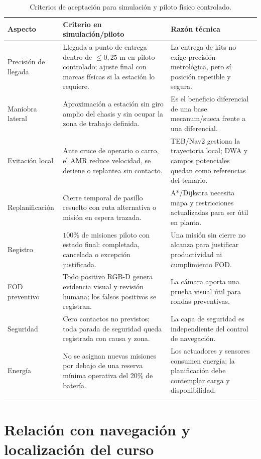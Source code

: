 \begin{longtable}{P{0.24\textwidth}P{0.30\textwidth}P{0.36\textwidth}}
\toprule
Aspecto & Criterio en simulación/piloto & Razón técnica\\
\midrule
\endhead
Precisión de llegada & Llegada a punto de entrega dentro de \(\leq 0,25\) m en piloto controlado; ajuste final con marcas físicas si la estación lo requiere. & La entrega de kits no exige precisión metrológica, pero sí posición repetible y segura.\\
Maniobra lateral & Aproximación a estación sin giro amplio del chasis y sin ocupar la zona de trabajo definida. & Es el beneficio diferencial de una base mecanum/sueca frente a una diferencial.\\
Evitación local & Ante cruce de operario o carro, el AMR reduce velocidad, se detiene o replantea sin contacto. & TEB/Nav2 gestiona la trayectoria local; DWA y campos potenciales quedan como referencias del temario.\\
Replanificación & Cierre temporal de pasillo resuelto con ruta alternativa o misión en espera trazada. & A*/Dijkstra necesita mapa y restricciones actualizadas para ser útil en planta.\\
Registro & \(100\%\) de misiones piloto con estado final: completada, cancelada o excepción justificada. & Una misión sin cierre no alcanza para justificar productividad ni cumplimiento FOD.\\
FOD preventivo & Todo positivo RGB-D genera evidencia visual y revisión humana; los falsos positivos se registran. & La cámara aporta una prueba visual útil para rondas preventivas.\\
Seguridad & Cero contactos no previstos; toda parada de seguridad queda registrada con causa y zona. & La capa de seguridad es independiente del control de navegación.\\
Energía & No se asignan nuevas misiones por debajo de una reserva mínima operativa del 20\% de batería. & Los actuadores y sensores consumen energía; la planificación debe contemplar carga y disponibilidad.\\
\bottomrule
\caption{Criterios de aceptación para simulación y piloto físico controlado.}
\label{tab:criterios-validacion}
\end{longtable}

\section{Relación con navegación y localización del curso}

